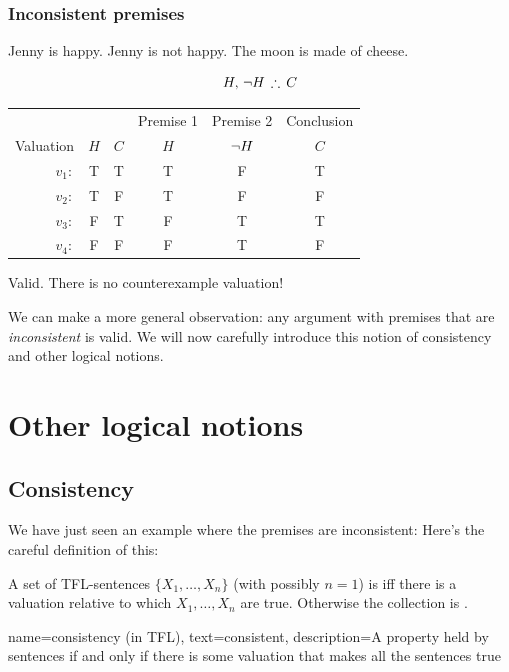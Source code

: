 \subsection{Inconsistent premises}
\begin{earg}
	\prem Jenny is happy.
	\prem Jenny is not happy.
	\conc The moon is made of cheese.
\end{earg}

$$H,\,\enot H\,\therefore\, C$$

\begin{center}
	\begin{tabular}{r c c | c | c | c}
		&&& Premise 1 & Premise 2 & Conclusion\\
		Valuation& $H$ & $C$ & $H$ & $\neg H$ & $C$\\[.3em]
		\hline
		$v_1:$ & T & T & T & F & T\\
		$v_2:$ & T & F & T & F & F\\
		$v_3:$ & F & T & F & T & T\\
		$v_4:$ & F & F & F & T & F\\
	\end{tabular}
\end{center}
Valid. There is no counterexample valuation!

We can make a more general observation: any argument with premises that are \emph{inconsistent} is valid. We will now carefully introduce this notion of consistency and other logical notions. 

\chapter{Other logical notions}

\section{Consistency}

We have just seen an example where the premises are inconsistent: Here's the careful definition of this:


\begin{definition}
	A set of TFL-sentences $\{X_1,\ldots,X_n\}$ (with possibly $n=1$) is  iff there is a valuation relative to which $X_1,\ldots,X_n$ are true. Otherwise the collection is .
\end{definition}

{
	name=consistency (in TFL),
	text=consistent,
	description={A property held by sentences if and only if there is some \gls{valuation} that makes all the sentences true}
}




